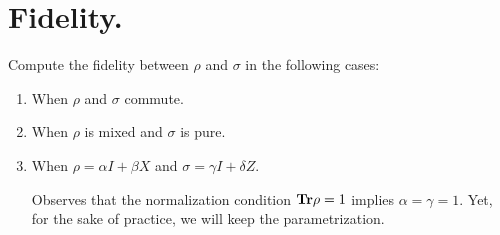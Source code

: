 \documentclass[12pt,a4paper]{article}
\begin{document}
\section{Fidelity.}
Compute the fidelity between $\rho$ and $\sigma$ in the following cases: 
\begin{enumerate}
  \item When $\rho$ and $\sigma$ commute. 


  \item When $\rho$ is mixed and $\sigma$ is pure.  

  \item When $\rho = \alpha I + \beta X $ and $\sigma = \gamma I + \delta Z$.
  \begin{remark}
Observes that the normalization condition $\mathbf{Tr} \rho = 1$ implies $\alpha = \gamma = 1$. Yet, for the sake of practice, we will keep the parametrization.
  \end{remark}

\end{enumerate}





\printbibliography 
\end{document}
